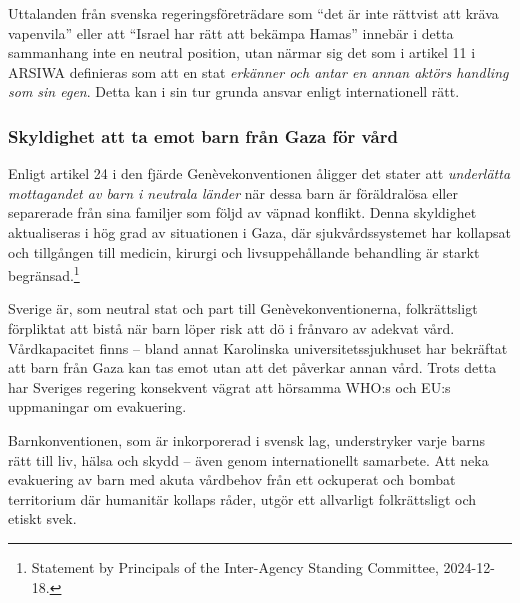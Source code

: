 Uttalanden från svenska regeringsföreträdare som \enquote{det är inte rättvist att kräva vapenvila} eller att \enquote{Israel har rätt att bekämpa Hamas} innebär i detta sammanhang inte en neutral position, utan närmar sig det som i artikel 11 i ARSIWA definieras som att en stat \textit{erkänner och antar en annan aktörs handling som sin egen}. Detta kan i sin tur grunda ansvar enligt internationell rätt.



\subsubsection*{Skyldighet att ta emot barn från Gaza för vård}

Enligt artikel 24 i den fjärde Genèvekonventionen åligger det stater att \textit{underlätta mottagandet av barn i neutrala länder} när dessa barn är föräldralösa eller separerade från sina familjer som följd av väpnad konflikt. Denna skyldighet aktualiseras i hög grad av situationen i Gaza, där sjukvårdssystemet har kollapsat och tillgången till medicin, kirurgi och livsuppehållande behandling är starkt begränsad.\footnote{Statement by Principals of the Inter-Agency Standing Committee, 2024-12-18.}


Sverige är, som neutral stat och part till Genèvekonventionerna, folkrättsligt förpliktat att bistå när barn löper risk att dö i frånvaro av adekvat vård. Vårdkapacitet finns – bland annat Karolinska universitetssjukhuset har bekräftat att barn från Gaza kan tas emot utan att det påverkar annan vård. Trots detta har Sveriges regering konsekvent vägrat att hörsamma WHO:s och EU:s uppmaningar om evakuering.

Barnkonventionen, som är inkorporerad i svensk lag, understryker varje barns rätt till liv, hälsa och skydd – även genom internationellt samarbete. Att neka evakuering av barn med akuta vårdbehov från ett ockuperat och bombat territorium där humanitär kollaps råder, utgör ett allvarligt folkrättsligt och etiskt svek.


